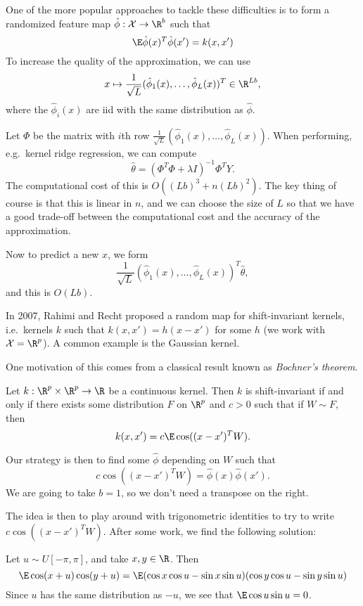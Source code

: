 \documentclass[a4paper]{article}
\begin{document}
One of the more popular approaches to tackle these difficulties is to form a randomized feature map $\hat{\phi}: \mathcal{X} \to \R^b$ such that
\[
  \E \hat{\phi}(x)^T \hat{\phi}(x') = k(x, x')
\]
To increase the quality of the approximation, we can use
\[
  x \mapsto \frac{1}{\sqrt{L}}(\hat{\phi}_1(x), \ldots, \hat{\phi}_L(x))^T \in \R^{Lb},
\]
where the $\hat{\phi}_i(x)$ are iid with the same distribution as $\hat{\phi}$.

Let $\Phi$ be the matrix with $i$th row $\frac{1}{\sqrt{L}}(\hat{\phi}_1(x), \ldots, \hat{\phi}_L(x))$. When performing, e.g.\ kernel ridge regression, we can compute
\[
  \hat{\theta} = (\Phi^T \Phi + \lambda I)^{-1} \Phi^T Y.
\]
The computational cost of this is $O((Lb)^3 + n (Lb)^2)$. The key thing of course is that this is linear in $n$, and we can choose the size of $L$ so that we have a good trade-off between the computational cost and the accuracy of the approximation.

Now to predict a new $x$, we form
\[
  \frac{1}{\sqrt{L}} (\hat{\phi}_1(x), \ldots, \hat{\phi}_L(x))^T \hat{\theta},
\]
and this is $O(Lb)$.

In 2007, Rahimi and Recht proposed a random map for shift-invariant kernels, i.e.\ kernels $k$ such that $k(x, x') = h(x - x')$ for some $h$ (we work with $\mathcal{X} = \R^p$). A common example is the Gaussian kernel.

One motivation of this comes from a classical result known as \emph{Bochner's theorem}.

\begin{thm}
  Let $k: \R^p \times \R^p \to \R$ be a continuous kernel. Then $k$ is shift-invariant if and only if there exists some distribution $F$ on $\R^p$ and $c > 0$ such that if $W \sim F$, then
  \[
    k(x, x') = c\E \cos((x - x')^T W).
  \]
\end{thm}
Our strategy is then to find some $\hat{\phi}$ depending on $W$ such that
\[
  c\cos((x - x')^T W) = \hat{\phi}(x) \hat{\phi}(x').
\]
We are going to take $b = 1$, so we don't need a transpose on the right.

The idea is then to play around with trigonometric identities to try to write $c \cos ((x - x')^T W)$. After some work, we find the following solution:

Let $u \sim U[-\pi, \pi]$, and take $x, y \in \R$. Then
\[
  \E \cos(x + u)\cos (y + u) = \E (\cos x \cos u - \sin x \sin u)(\cos y \cos u - \sin y \sin u)
\]
Since $u$ has the same distribution as $-u$, we see that $\E \cos u\sin u = 0$.
\end{document}
